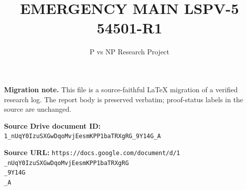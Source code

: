 \documentclass[11pt]{article}
\title{EMERGENCY MAIN LSPV-5 54501-R1}
\author{P vs NP Research Project}
\date{}
\begin{document}
\maketitle

\noindent\textbf{Migration note.} This file is a source-faithful LaTeX migration of a verified research log. The report body is preserved verbatim; proof-status labels in the source are unchanged.

\noindent\textbf{Source Drive document ID:} \texttt{1_nUqY0IzuSXGwDqoMvjEesmKPP1baTRXgRG_9Y14G_A}

\noindent\textbf{Source URL:} \texttt{https://docs.google.com/document/d/1\\_nUqY0IzuSXGwDqoMvjEesmKPP1baTRXgRG\\_9Y14G\\_A}
\end{document}
